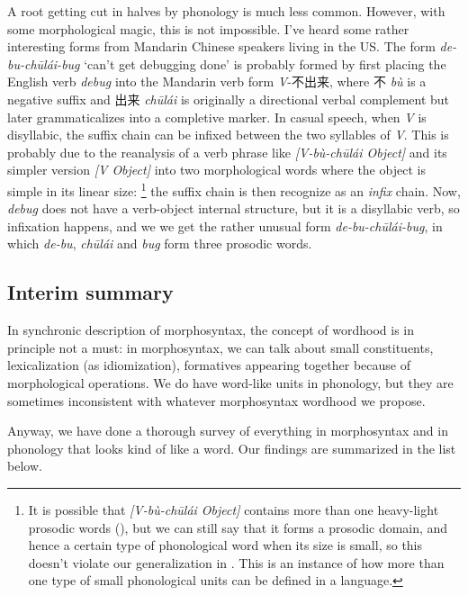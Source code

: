 \documentclass[a4paper, oneside, scheme=plain, 12pt]{article}
\newcommand{\form}[1]{\emph{#1}}
\newcommand{\translate}[1]{`#1'}
\begin{document}
A root getting cut in halves by phonology is much less common.
However, with some morphological magic, this is not impossible.
I've heard some rather interesting forms from Mandarin Chinese speakers living in the US.
The form \form{de-bu-chūlái-bug} \translate{can't get debugging done}
is probably formed by first placing the English verb \form{debug}
into the Mandarin verb form \form{V}-不出来,
where 不 \form{bù} is a negative suffix and 出来 \form{chūlái} is originally a directional verbal complement
but later grammaticalizes into a completive marker.
In casual speech, when \form{V} is disyllabic,
the suffix chain can be infixed between the two syllables of \form{V}.
This is probably due to the reanalysis of a verb phrase like \form{[V-bù-chūlái Object]}
and its simpler version \form{[V Object]} into two morphological words
where the object is simple in its linear size:%
\footnote{
    It is possible that \form{[V-bù-chūlái Object]} contains more than one heavy-light prosodic words
    (),
    but we can still say that it forms a prosodic domain,
    and hence a certain type of phonological word when its size is small,
    so this doesn't violate our generalization in .
    This is an instance of how more than one type of small phonological units can be defined in a language.
}
the suffix chain is then recognize as an \emph{infix} chain.
Now, \form{debug} does not have a verb-object internal structure,
but it is a disyllabic verb, so infixation happens,
and we we get the rather unusual form \form{de-bu-chūlái-bug},
in which \form{de-bu}, \form{chūlái} and \form{bug} form three prosodic words.

\subsection{Interim summary}\label{sec:all-wordhood}

In synchronic description of morphosyntax,
the concept of wordhood is in principle not a must:
in morphosyntax, we can talk about small constituents, lexicalization (as idiomization),
formatives appearing together because of morphological operations.
We do have word-like units in phonology,
but they are sometimes inconsistent with whatever morphosyntax wordhood we propose.

Anyway, we have done a thorough survey of everything in morphosyntax and in phonology that looks kind of like a word. 
Our findings are summarized in the list below.
\end{document}
